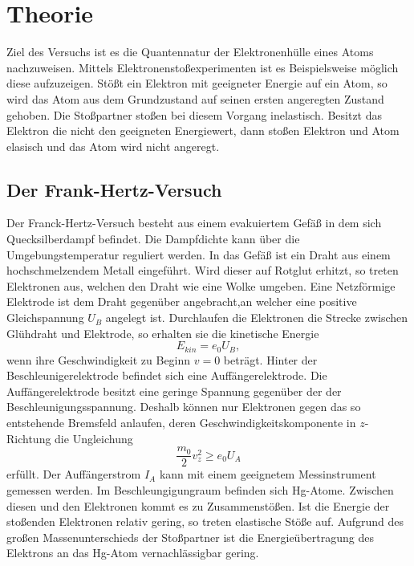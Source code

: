 \section{Theorie}
\label{sec:Theorie}
Ziel des Versuchs ist es die Quantennatur der Elektronenhülle eines Atoms nachzuweisen.
Mittels Elektronenstoßexperimenten ist es Beispielsweise möglich diese aufzuzeigen.
Stößt ein Elektron mit geeigneter Energie auf ein Atom, so wird das Atom aus dem Grundzustand auf seinen ersten angeregten Zustand gehoben.
Die Stoßpartner stoßen bei diesem Vorgang inelastisch.
Besitzt das Elektron die nicht den geeigneten Energiewert, dann stoßen Elektron und Atom elasisch und das Atom wird nicht angeregt.

\subsection{Der Frank-Hertz-Versuch}
Der Franck-Hertz-Versuch besteht aus einem evakuiertem Gefäß in dem sich Quecksilberdampf befindet.
Die Dampfdichte kann über die Umgebungstemperatur reguliert werden.
In das Gefäß ist ein Draht aus einem hochschmelzendem Metall eingeführt.
Wird dieser auf Rotglut erhitzt, so treten Elektronen aus, welchen den Draht wie eine Wolke umgeben.
Eine Netzförmige Elektrode ist dem Draht gegenüber angebracht,an welcher eine positive Gleichspannung $U_B$ angelegt ist.
Durchlaufen die Elektronen die Strecke zwischen Glühdraht und Elektrode, so erhalten sie die kinetische Energie
\begin{equation}
  \label{eq:ekin}
  E_{kin} = e_0 U_B  ,
\end{equation}
wenn ihre Geschwindigkeit zu Beginn $v= 0$ beträgt.
Hinter der Beschleunigerelektrode befindet sich eine Auffängerelektrode.
Die Auffängerelektrode besitzt eine geringe Spannung gegenüber der der Beschleunigungsspannung.
Deshalb können nur Elektronen gegen das so entstehende Bremsfeld anlaufen, deren Geschwindigkeitskomponente in $z$-Richtung die Ungleichung
\begin{equation}
  \label{eq:ungl}
  \frac{m_0}{2}v_z^2 \geq e_0 U_A
\end{equation}
erfüllt.
Der Auffängerstrom $I_A$ kann mit einem geeignetem Messinstrument gemessen werden.
Im Beschleungigungraum befinden sich Hg-Atome.
Zwischen diesen und den Elektronen kommt es zu Zusammenstößen.
Ist die Energie der stoßenden Elektronen relativ gering, so treten elastische Stöße auf.
Aufgrund des großen Massenunterschieds der Stoßpartner ist die Energieübertragung des Elektrons an das Hg-Atom vernachlässigbar gering.
